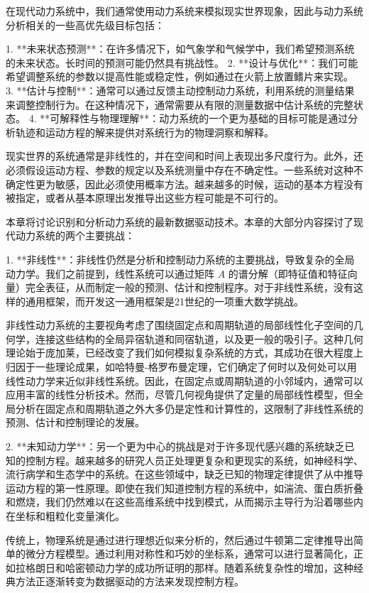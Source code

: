 \documentclass{ctexart}
\begin{document}
在现代动力系统中，我们通常使用动力系统来模拟现实世界现象，因此与动力系统分析相关的一些高优先级目标包括：

1. **未来状态预测**：在许多情况下，如气象学和气候学中，我们希望预测系统的未来状态。长时间的预测可能仍然具有挑战性。
2. **设计与优化**：我们可能希望调整系统的参数以提高性能或稳定性，例如通过在火箭上放置鳍片来实现。
3. **估计与控制**：通常可以通过反馈主动控制动力系统，利用系统的测量结果来调整控制行为。在这种情况下，通常需要从有限的测量数据中估计系统的完整状态。
4. **可解释性与物理理解**：动力系统的一个更为基础的目标可能是通过分析轨迹和运动方程的解来提供对系统行为的物理洞察和解释。

现实世界的系统通常是非线性的，并在空间和时间上表现出多尺度行为。此外，还必须假设运动方程、参数的规定以及系统测量中存在不确定性。一些系统对这种不确定性更为敏感，因此必须使用概率方法。越来越多的时候，运动的基本方程没有被指定，或者从基本原理出发推导出这些方程可能是不可行的。

本章将讨论识别和分析动力系统的最新数据驱动技术。本章的大部分内容探讨了现代动力系统的两个主要挑战：

1. **非线性**：非线性仍然是分析和控制动力系统的主要挑战，导致复杂的全局动力学。我们之前提到，线性系统可以通过矩阵 \(A\) 的谱分解（即特征值和特征向量）完全表征，从而制定一般的预测、估计和控制程序。对于非线性系统，没有这样的通用框架，而开发这一通用框架是21世纪的一项重大数学挑战。

   非线性动力系统的主要视角考虑了围绕固定点和周期轨道的局部线性化子空间的几何学，连接这些结构的全局异宿轨道和同宿轨道，以及更一般的吸引子。这种几何理论始于庞加莱，已经改变了我们如何模拟复杂系统的方式，其成功在很大程度上归因于一些理论成果，如哈特曼-格罗布曼定理，它们确定了何时以及何处可以用线性动力学来近似非线性系统。因此，在固定点或周期轨道的小邻域内，通常可以应用丰富的线性分析技术。然而，尽管几何视角提供了定量的局部线性模型，但全局分析在固定点和周期轨道之外大多仍是定性和计算性的，这限制了非线性系统的预测、估计和控制理论的发展。

2. **未知动力学**：另一个更为中心的挑战是对于许多现代感兴趣的系统缺乏已知的控制方程。越来越多的研究人员正处理更复杂和更现实的系统，如神经科学、流行病学和生态学中的系统。在这些领域中，缺乏已知的物理定律提供了从中推导运动方程的第一性原理。即使在我们知道控制方程的系统中，如湍流、蛋白质折叠和燃烧，我们仍然难以在这些高维系统中找到模式，从而揭示主导行为沿着哪些内在坐标和粗粒化变量演化。

传统上，物理系统是通过进行理想近似来分析的，然后通过牛顿第二定律推导出简单的微分方程模型。通过利用对称性和巧妙的坐标系，通常可以进行显著简化，正如拉格朗日和哈密顿动力学的成功所证明的那样。随着系统复杂性的增加，这种经典方法正逐渐转变为数据驱动的方法来发现控制方程。
\end{document}
